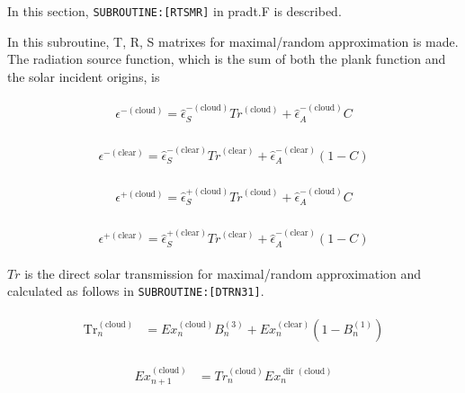 In this section, \texttt{SUBROUTINE:{[}RTSMR{]}} in pradt.F is
described.

In this subroutine, T, R, S matrixes for maximal/random approximation is
made. The radiation source function, which is the sum of both the plank
function and the solar incident origins, is

\begin{eqnarray}
\begin{array}{l}
\epsilon^{-(\text {cloud})}=\hat{\epsilon}_{S}^{-(\text {cloud})} {Tr}^{(\text {cloud})}+\hat{\epsilon}_{A}^{-(\text {cloud})} C
\end{array}
\end{eqnarray}

\begin{eqnarray}
\begin{array}{l}
\epsilon^{-(\text {clear})}=\hat{\epsilon}_{S}^{-(\text {clear})}{Tr}^{(\text {clear})}+\hat{\epsilon}_{A}^{-(\text {clear})}(1-C)
\end{array}
\end{eqnarray}

\begin{eqnarray}
\begin{array}{l}
\epsilon^{+(\text {cloud})}=\hat{\epsilon}_{S}^{+(\text {cloud})}{Tr}^{(\text {cloud})}+\hat{\epsilon}_{A}^{-(\text {cloud})} C
\end{array}
\end{eqnarray}

\begin{eqnarray}
\begin{array}{l}
\epsilon^{+(\text {clear})}=\hat{\epsilon}_{S}^{+(\text {clear})}{Tr}^{(\text {clear})}+\hat{\epsilon}_{A}^{-(\text {clear})}(1-C)
\end{array}
\end{eqnarray}

\(Tr\) is the direct solar transmission for maximal/random approximation
and calculated as follows in \texttt{SUBROUTINE:{[}DTRN31{]}}.

\begin{eqnarray}
\begin{aligned}
\operatorname{Tr}_{n}^{(\text {cloud})} &=E x_{n}^{(\text {cloud})} B_{n}^{(3)}+E x_{n}^{(\text {clear})}\left(1-B_{n}^{(1)}\right)
\end{aligned}
\end{eqnarray}

\begin{eqnarray}
\begin{aligned}
E x_{n+1}^{(\text {cloud})} &={Tr}_{n}^{(\text {cloud})} E x_{n}^{\operatorname{dir}(\text {cloud})}
\end{aligned}
\end{eqnarray}

